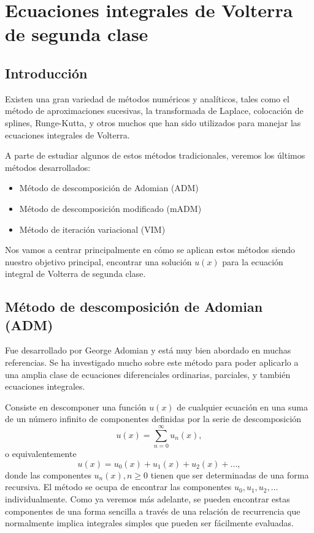 \chapter{Ecuaciones integrales de Volterra de segunda clase}

\section{Introducción}
Existen una gran variedad de métodos numéricos y analíticos, tales como el método de aproximaciones sucesivas, la transformada de Laplace, colocación de splines, Runge-Kutta, y otros muchos que han sido utilizados para manejar las ecuaciones integrales de Volterra.

A parte de estudiar algunos de estos métodos tradicionales, veremos los últimos métodos desarrollados:
\begin{itemize}
	\item Método de descomposición de Adomian (ADM)
	\item Método de descomposición modificado (mADM)
	\item Método de iteración variacional (VIM)
\end{itemize}
Nos vamos a centrar principalmente en cómo se aplican estos métodos siendo nuestro objetivo principal, encontrar una solución $u(x)$ para la ecuación integral de Volterra de segunda clase.
\section{Método de descomposición de Adomian (ADM)}
Fue desarrollado por George Adomian y está muy bien abordado en muchas referencias. Se ha investigado mucho sobre este método para poder aplicarlo a una amplia clase de ecuaciones diferenciales ordinarias, parciales, y también ecuaciones integrales.

Consiste en descomponer una función $u(x)$ de cualquier ecuación en una suma de un número infinito de componentes definidas por la serie de descomposición
\begin{equation}\label{eq:sum_adomian}
	u(x) = \sum_{n=0}^{\infty} u_n(x),
\end{equation} 
o equivalentemente 
\begin{equation}
	u(x) = u_0(x) + u_1(x) + u_2(x) + ... ,
\end{equation} 
donde las componentes $u_n(x), n \geqslant 0$ tienen que ser determinadas de una forma recursiva. El método se ocupa de encontrar las componentes $u_0, u_1, u_2, ...$ individualmente. Como ya veremos más adelante, se pueden encontrar estas componentes de una forma sencilla a través de una relación de recurrencia que normalmente implica integrales simples que pueden ser fácilmente evaluadas.

